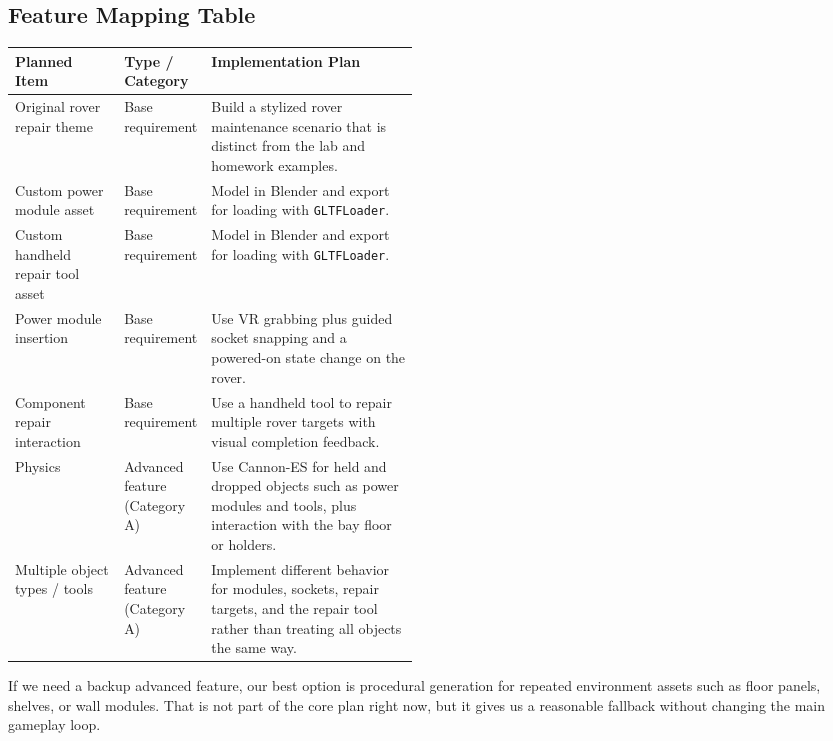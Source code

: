 \documentclass{article}
\begin{document}
\subsection*{Feature Mapping Table}

{\footnotesize
	\setlength{\tabcolsep}{4pt}
	\begin{tabularx}{\linewidth}{>{\raggedright\arraybackslash}p{0.27\linewidth} >{\raggedright\arraybackslash}p{0.20\linewidth} X}
		\toprule
		\textbf{Planned Item}             & \textbf{Type / Category}      & \textbf{Implementation Plan}                                                                                                          \\
		\midrule
		Original rover repair theme       & Base requirement              & Build a stylized rover maintenance scenario that is distinct from the lab and homework examples.                                      \\
		Custom power module asset         & Base requirement              & Model in Blender and export for loading with \texttt{GLTFLoader}.                                                                     \\
		Custom handheld repair tool asset & Base requirement              & Model in Blender and export for loading with \texttt{GLTFLoader}.                                                                     \\
		Power module insertion            & Base requirement              & Use VR grabbing plus guided socket snapping and a powered-on state change on the rover.                                               \\
		Component repair interaction      & Base requirement              & Use a handheld tool to repair multiple rover targets with visual completion feedback.                                                 \\
		Physics                           & Advanced feature (Category A) & Use Cannon-ES for held and dropped objects such as power modules and tools, plus interaction with the bay floor or holders.           \\
		Multiple object types / tools     & Advanced feature (Category A) & Implement different behavior for modules, sockets, repair targets, and the repair tool rather than treating all objects the same way. \\
		\bottomrule
	\end{tabularx}
}

If we need a backup advanced feature, our best option is procedural generation for repeated environment assets such as floor panels, shelves, or wall modules. That is not part of the core plan right now, but it gives us a reasonable fallback without changing the main gameplay loop.
\end{document}
